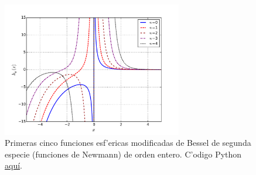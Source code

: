 %
\begin{figure}[H]
\centering
\includegraphics[angle=0,width=0.7\textwidth]{figs/fig-Bessel-Esferica-k.pdf}
\caption{Primeras cinco funciones esf'ericas modificadas de Bessel de segunda especie (funciones de Newmann) de orden entero. C'odigo Python \href{https://github.com/gfrubi/FM2/blob/master/figuras-editables/fig-Bessel.py}{aqu\'i}.}
\label{fig-kn}
\end{figure}